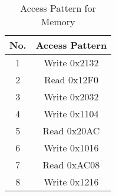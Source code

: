 \documentclass[addpoints, 12pt, answers]{exam}
\begin{document}
\begin{questions}
	\begin{table}[H]
		\centering
		\caption{Access Pattern for Memory}
		\label{tab:access}
		\begin{tabular}{|c|c|}
			\hline
			No. & Access Pattern \\ \hline
			1   & Write 0x2132   \\ \hline
			2   & Read  0x12F0   \\ \hline
			3   & Write 0x2032   \\ \hline
			4   & Write 0x1104   \\ \hline
			5   & Read  0x20AC   \\ \hline
			6   & Write 0x1016   \\ \hline
			7   & Read  0xAC08   \\ \hline
			8   & Write 0x1216   \\ \hline
		\end{tabular}
	\end{table}



\end{questions}
\end{document}
